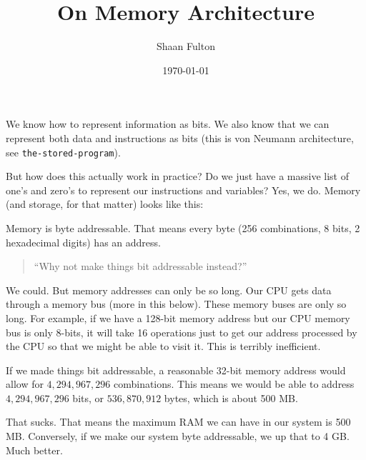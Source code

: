 \documentclass[12pt]{article}
\title{On Memory Architecture}
\author{Shaan Fulton}
\date{\today}
\begin{document}
\maketitle

We know how to represent information as bits. We also know that we can represent both data and instructions as bits (this is von Neumann architecture, see \texttt{the-stored-program}).

But how does this actually work in practice? Do we just have a massive list of one's and zero's to represent our instructions and variables? Yes, we do. Memory (and storage, for that matter) looks like this:

\begin{center}
\end{center}

Memory is byte addressable. That means every byte (256 combinations, 8 bits, 2 hexadecimal digits) has an address.

\begin{quote}
``Why not make things bit addressable instead?''
\end{quote}

We could. But memory addresses can only be so long. Our CPU gets data through a memory bus (more in this below). These memory buses are only so long. For example, if we have a 128-bit memory address but our CPU memory bus is only 8-bits, it will take 16 operations just to get our address processed by the CPU so that we might be able to visit it. This is terribly inefficient.

If we made things bit addressable, a reasonable 32-bit memory address would allow for $4,294,967,296$ combinations. This means we would be able to address $4,294,967,296$ bits, or $536,870,912$ bytes, which is about 500 MB.

That sucks. That means the maximum RAM we can have in our system is 500 MB. Conversely, if we make our system byte addressable, we up that to 4 GB. Much better.
\end{document}
